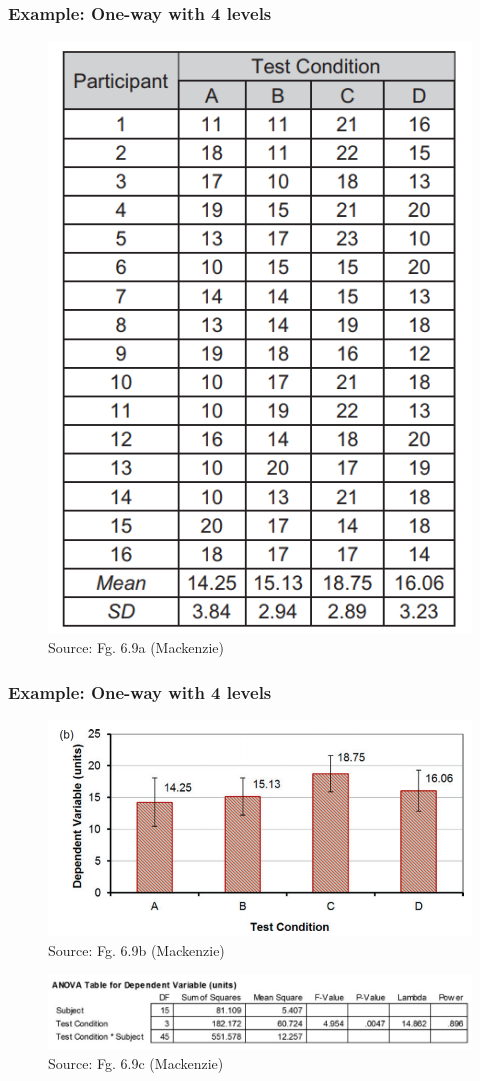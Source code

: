 \documentclass{beamer}
\begin{document}
\begin{frame}
	\frametitle{Example: One-way with 4 levels} 
	\begin{figure}
		\includegraphics[width=0.35\linewidth]{4result}
		\caption{Source: Fg. 6.9a (Mackenzie)}
	\end{figure}
\end{frame}

\begin{frame}
	\frametitle{Example: One-way with 4 levels} 
	\begin{figure}
		\includegraphics[width=0.6\linewidth]{4resulta}
		\caption{Source: Fg. 6.9b (Mackenzie)}
	\end{figure}
	\begin{figure}
	\includegraphics[width=0.8\linewidth]{4resultc}
	\caption{Source: Fg. 6.9c (Mackenzie)}
\end{figure}
\end{frame}
\end{document}

